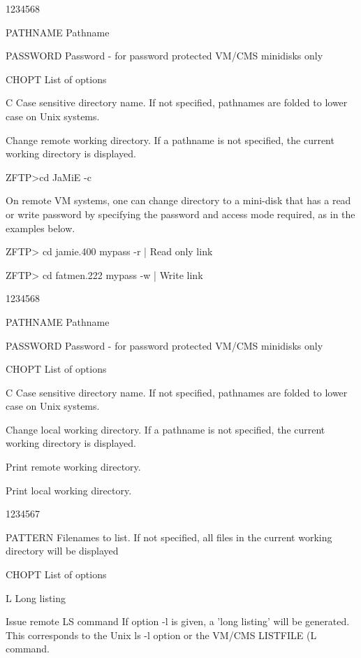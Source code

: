 \begin{DLtt}{1234568}
\item[PATHNAME]Pathname
\item[PASSWORD]Password - for password protected VM/CMS minidisks only
\item[CHOPT]List of options
\begin{DLtt}{12}
\item[C]Case sensitive directory name. If not specified,
pathnames are folded to lower case on Unix systems.
\end{DLtt}
\end{DLtt}
Change remote working directory.
If a pathname is not specified, the current working directory
is displayed.
\begin{XMP}
ZFTP>cd JaMiE -c
\end{XMP}
\par
On remote VM systems, one can change directory to a mini-disk that
has a read or write password by specifying the password and access
mode required, as in the examples below.
\begin{XMP}
ZFTP> cd jamie.400 mypass -r | Read only link

ZFTP> cd fatmen.222 mypass -w | Write link

\end{XMP}
\begin{DLtt}{1234568}
\item[PATHNAME]Pathname
\item[PASSWORD]Password - for password protected VM/CMS minidisks only
\item[CHOPT]List of options
\begin{DLtt}{12}
\item[C]Case sensitive directory name. If not specified,
pathnames are folded to lower case on Unix systems.
\end{DLtt}
\end{DLtt}
Change local working directory.
If a pathname is not specified, the current working directory
is displayed.

Print remote working directory.

Print local working directory.

\begin{DLtt}{1234567}
\item[PATTERN]Filenames to list. If not specified, all files in the
current working directory will be displayed
\item[CHOPT]List of options
\begin{DLtt}{12}
\item[L]Long listing
\end{DLtt}
\end{DLtt}
Issue remote LS command
If option -l is given, a 'long listing' will be generated.
This corresponds to the Unix ls -l option or the VM/CMS
LISTFILE (L command.

